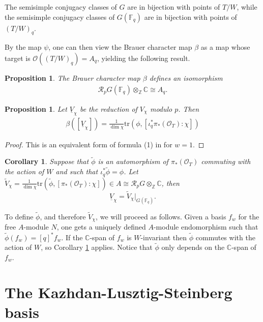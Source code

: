 \documentclass{amsart}
\newtheorem{corollary}[thm]{Corollary}
\newtheorem{prop}[thm]{Proposition}
\theoremstyle{definition}
\renewcommand{\O}{\mathcal{O}}
\begin{document}
The semisimple conjugacy classes of $G$ are in bijection with points of $T/W$, while the semisimple conjugacy classes of $G(\mathbb{F}_q)$ are in bijection with points of $(T/W)_q$.

By the map $\psi$, one can then view the Brauer character map $\beta$ as a map whose target is $\mathcal{O}((T/W)_q) = A_q$, yielding the following result.

\begin{prop}
    The Brauer character map $\beta$ defines an isomorphism 
    \begin{align}
        \mathcal{R}_pG(\mathbb{F}_q)\otimes_{\mathbb{Z}} \mathbb{C} \cong A_q.
    \end{align}
\end{prop}

\begin{prop}
    Let $\underline{V}_\chi$ be the reduction of $V_\chi$ modulo $p$. Then
    \begin{align}
        \beta([\underline{V}_\chi]) = \frac{1}{\dim \chi}\mathrm{tr}(\phi, [\iota_q^*\pi_*(\mathcal{O}_T) : \chi])
    \end{align}
\end{prop}
\begin{proof}
    This is an equivalent form of formula (1) in \cite[Section 3.2]{J} for $w = 1$.
\end{proof}

\begin{corollary}\label{cor:comm}
Suppose that $\tilde \phi$ is an automorphism of $\pi_*(\O_T)$ commuting with the action of $W$ and such that $\iota_q^*\tilde \phi =\phi$.
Let $\tilde V_\chi=\frac{1}{\dim \chi}\mathrm{tr}(\tilde \phi,  [\pi_*(\O_T):\chi]) \in A\cong \mathcal{R}_pG \otimes_{\mathbb{Z}}\mathbb{C}$, then 
\begin{equation}\label{barV}
\underline{V}_\chi=\tilde V_\chi|_{G(\mathbb{F}_q)}.
\end{equation}
\end{corollary}

To define $\tilde{\phi}$, and therefore $\tilde{V}_{\chi}$, we will proceed as follows. Given a basis $f_w$ for the free $A$-module $N$, one gets a uniquely defined $A$-module endomorphism such
that $\tilde \phi(f_w)=[q]^*f_w$.
If the $\mathbb{C}$-span of  $f_w$ is $W$-invariant then $\tilde{\phi}$ commutes with the action of $W$, so Corollary \ref{cor:comm} applies. Notice that $\tilde \phi$ only depends on the $\mathbb{C}$-span of $f_w$.

\section{The Kazhdan-Lusztig-Steinberg basis}
\end{document}
